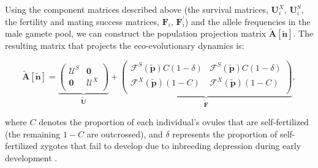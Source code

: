 \documentclass[11pt]{article}
\def\mbf#1{\mathbf{#1}}
\def\mcal#1{\mathcal{#1}}
\begin{document}
Using the component matrices described above (the survival matrices, $\mathbf{U}^X_i$, $\mathbf{U}^S_i$, the fertility and mating success matrices, $\mathbf{F}_i$, $\mathbf{F}^\prime_i$) and the allele frequencies in the male gamete pool, we can construct the population projection matrix $\tilde{\mbf{A}}[\tilde{\mbf{n}}]$. The resulting matrix that projects the eco-evolutionary dynamics is:
\begin{linenomath*}
\begin{equation} \label{eq:Atilde}
	\tilde{\mbf{A}}[\tilde{\mbf{n}}] = 
			\underbrace{\left(
			\begin{array}{c|c}
				\mcal{U}^S & \mbf{0} \\ \hline
				\mbf{0} & \mcal{U}^X \\
			\end{array} \right)}_{\tilde{\mbf{U}}} + 
			\underbrace{\left(
			\begin{array}{c|c}
				\mcal{F}^S(\tilde{\mbf{p}}) C(1 - \delta) & \mcal{F}^S(\tilde{\mbf{p}}) C(1 - \delta) \\ \hline
				\mcal{F}^X(\tilde{\mbf{p}}) (1 - C) & \mcal{F}^X(\tilde{\mbf{p}}) (1 - C)\\
			\end{array} \right)}_{\tilde{\mbf{F}}},
\end{equation}
\end{linenomath*}
where $C$ denotes the proportion of each individual's ovules that are self-fertilized (the remaining $1 - C$ are outcrossed), and  $\delta$ represents the proportion of self-fertilized zygotes that fail to develop due to inbreeding depression during early development \citep{Charlesworth1987}. 
\end{document}
